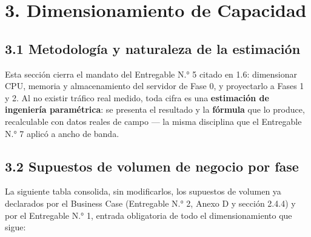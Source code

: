 \documentclass[11pt,a4paper]{article}
\begin{document}
\section{3. Dimensionamiento de Capacidad}\label{dimensionamiento-de-capacidad}

\subsection{3.1 Metodología y naturaleza de la estimación}\label{metodologuxeda-y-naturaleza-de-la-estimaciuxf3n}

Esta sección cierra el mandato del Entregable N.° 5 citado en 1.6: dimensionar CPU, memoria y almacenamiento del servidor de Fase 0, y proyectarlo a Fases 1 y 2. Al no existir tráfico real medido, toda cifra es una \textbf{estimación de ingeniería paramétrica}: se presenta el resultado y la \textbf{fórmula} que lo produce, recalculable con datos reales de campo --- la misma disciplina que el Entregable N.° 7 aplicó a ancho de banda.

\subsection{3.2 Supuestos de volumen de negocio por fase}\label{supuestos-de-volumen-de-negocio-por-fase}

La siguiente tabla consolida, sin modificarlos, los supuestos de volumen ya declarados por el Business Case (Entregable N.° 2, Anexo D y sección 2.4.4) y por el Entregable N.° 1, entrada obligatoria de todo el dimensionamiento que sigue:
\end{document}
